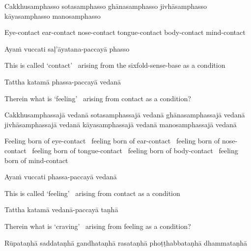 \begin{pali-hang}
  Cakkhusamphasso sotasamphasso ghānasamphasso jivhāsamphasso kāyasamphasso manosamphasso
\end{pali-hang}

\begin{english-hang}
  Eye-contact ear-contact nose-contact tongue-contact body-contact mind-contact
\end{english-hang}

Ayaṁ vuccati saḷ'āyatana-paccayā phasso

\begin{english-hang}
  This is called `contact' \breathmark\ arising from the sixfold-sense-base as a condition
\end{english-hang}

Tattha katamā phassa-paccayā vedanā

\begin{english}
  Therein what is `feeling' \breathmark\ arising from contact as a condition?
\end{english}

\begin{pali-hang}
  Cakkhusamphassajā vedanā sotasamphassajā vedanā ghānasamphassajā vedanā jivhāsamphassajā vedanā kāyasamphassajā vedanā manosamphassajā vedanā
\end{pali-hang}

\begin{english-hang-verses}
  Feeling born of eye-contact \breathmark\ feeling born of ear-contact \breathmark\
  feeling born of nose-contact \breathmark\ feeling born of tongue-contact \breathmark\ feeling born of body-contact \breathmark\ feeling born of mind-contact
\end{english-hang-verses}

Ayaṁ vuccati phassa-paccayā vedanā

\begin{english}
  This is called `feeling' \breathmark\ arising from contact as a condition
\end{english}

Tattha katamā vedanā-paccayā taṇhā

\begin{english}
  Therein what is `craving' \breathmark\ arising from feeling as a condition?
\end{english}

\begin{pali-hang}
  Rūpataṇhā saddataṇhā gandhataṇhā rasataṇhā phoṭṭhabbataṇhā dhammataṇhā
\end{pali-hang}

